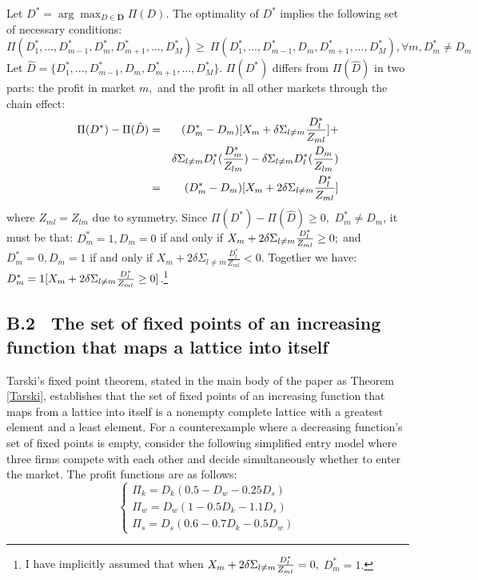 \documentclass[notitlepage,onecolumn,11pt]{article}
\begin{document}
Let $D^{\ast }=\arg \max_{D\in \mathbf{D}}\Pi (D)$. The optimality of $%
D^{\ast }$ implies the following set of necessary conditions:%
\begin{equation*}
\Pi (D_{1}^{\ast },...,D_{m-1}^{\ast },D_{m}^{\ast },D_{m+1}^{\ast
},...,D_{M}^{\ast })\geq \ \Pi (D_{1}^{\ast },...,D_{m-1}^{\ast
},D_{m},D_{m+1}^{\ast },...,D_{M}^{\ast }),\forall m,D_{m}^{\ast }\neq D_{m}
\end{equation*}%
Let $\hat{D}=\{D_{1}^{\ast },...,D_{m-1}^{\ast },D_{m},D_{m+1}^{\ast
},...,D_{M}^{\ast }\}.$ $\Pi (D^{\ast })$ differs from $\Pi (\hat{D})$ in
two parts: the profit in market $m,$ and the profit in all other markets
through the chain effect:%
\begin{eqnarray*}
\Pi (D^{\ast })-\Pi (\hat{D}) &=&(D_{m}^{\ast }-D_{m})[X_{m}+\delta \Sigma
_{l\neq m}\frac{D_{l}^{\ast }}{Z_{ml}}]+ \\
&&\delta \Sigma _{l\neq m}D_{l}^{\ast }(\frac{D_{m}^{\ast }}{Z_{lm}})-\delta
\Sigma _{l\neq m}D_{l}^{\ast }(\frac{D_{m}}{Z_{lm}}) \\
&=&(D_{m}^{\ast }-D_{m})[X_{m}+2\delta \Sigma _{l\neq m}\frac{D_{l}^{\ast }}{%
Z_{ml}}]
\end{eqnarray*}%
where $Z_{ml}=Z_{lm}$ due to symmetry. Since $\Pi (D^{\ast })-\Pi (\hat{D}%
)\geq 0,$ $D_{m}^{\ast }\neq D_{m}$, it must be that: $D_{m}^{\ast
}=1,D_{m}=0$ if and only if $X_{m}+2\delta \Sigma _{l\neq m}\frac{%
D_{l}^{\ast }}{Z_{ml}}\geq 0;$ and $D_{m}^{\ast }=0,D_{m}=1$ if and only if $%
X_{m}+2\delta \Sigma _{l\neq m}\frac{D_{l}^{\ast }}{Z_{ml}}<0.$ Together we
have: $D_{m}^{\ast }=1[X_{m}+2\delta \Sigma _{l\neq m}\frac{D_{l}^{\ast }}{%
Z_{ml}}\geq 0]$.\footnote{%
I have implicitly assumed that when $X_{m}+2\delta \Sigma _{l\neq m}\frac{%
D_{l}^{\ast }}{Z_{ml}}=0,$ $D_{m}^{\ast }=1.$}

\subsection*{B.2 \ The set of fixed points of an increasing function that
maps a lattice into itself}

Tarski's fixed point theorem, stated in the main body of the paper as
Theorem \ref{Tarski}, establishes that the set of fixed points of an
increasing function that maps from a lattice into itself is a nonempty
complete lattice with a greatest element and a least element. For a
counterexample where a decreasing function's set of fixed points is empty,
consider the following simplified entry model where three firms compete with
each other and decide simultaneously whether to enter the market. The profit
functions are as follows:%
\begin{equation*}
\left\{ 
\begin{array}{c}
\Pi _{k}=D_{k}(0.5-D_{w}-0.25D_{s}) \\ 
\Pi _{w}=D_{w}(1-0.5D_{k}-1.1D_{s}) \\ 
\Pi _{s}=D_{s}(0.6-0.7D_{k}-0.5D_{w})%
\end{array}%
\right.
\end{equation*}
\end{document}
